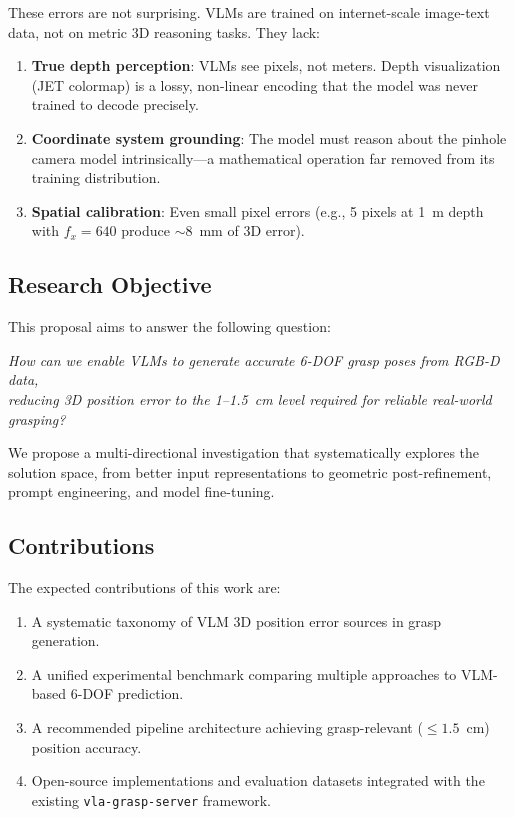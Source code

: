\documentclass[11pt,a4paper]{article}
\begin{document}
These errors are not surprising. VLMs are trained on internet-scale image-text data, not on metric 3D reasoning tasks. They lack:
\begin{enumerate}[nosep]
    \item \textbf{True depth perception}: VLMs see pixels, not meters. Depth visualization (JET colormap) is a lossy, non-linear encoding that the model was never trained to decode precisely.
    \item \textbf{Coordinate system grounding}: The model must reason about the pinhole camera model intrinsically---a mathematical operation far removed from its training distribution.
    \item \textbf{Spatial calibration}: Even small pixel errors (e.g., 5 pixels at 1~m depth with $f_x=640$ produce $\sim$8~mm of 3D error).
\end{enumerate}

\subsection{Research Objective}

This proposal aims to answer the following question:

\begin{center}
\textit{How can we enable VLMs to generate accurate 6-DOF grasp poses from RGB-D data,}\\
\textit{reducing 3D position error to the 1--1.5~cm level required for reliable real-world grasping?}
\end{center}

We propose a multi-directional investigation that systematically explores the solution space, from better input representations to geometric post-refinement, prompt engineering, and model fine-tuning.

\subsection{Contributions}

The expected contributions of this work are:
\begin{enumerate}[nosep]
    \item A systematic taxonomy of VLM 3D position error sources in grasp generation.
    \item A unified experimental benchmark comparing multiple approaches to VLM-based 6-DOF prediction.
    \item A recommended pipeline architecture achieving grasp-relevant ($\leq 1.5$~cm) position accuracy.
    \item Open-source implementations and evaluation datasets integrated with the existing \texttt{vla-grasp-server} framework.
\end{enumerate}
\end{document}
